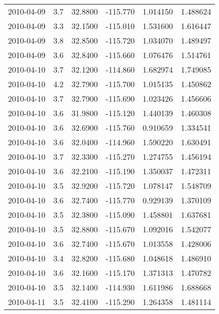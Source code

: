 \begin{tabular}{lrrrrr}
2010-04-09 &       3.7 &  32.8800 &  -115.770 &         1.014150 &         1.488624 \\
2010-04-09 &       3.3 &  32.1500 &  -115.010 &         1.531600 &         1.616447 \\
2010-04-09 &       3.8 &  32.8500 &  -115.720 &         1.034070 &         1.489497 \\
2010-04-09 &       3.6 &  32.8400 &  -115.660 &         1.076476 &         1.514761 \\
2010-04-10 &       3.7 &  32.1200 &  -114.860 &         1.682974 &         1.749085 \\
2010-04-10 &       4.2 &  32.7900 &  -115.700 &         1.015135 &         1.450862 \\
2010-04-10 &       3.7 &  32.7900 &  -115.690 &         1.023426 &         1.456606 \\
2010-04-10 &       3.6 &  31.9800 &  -115.120 &         1.440139 &         1.460308 \\
2010-04-10 &       3.6 &  32.6900 &  -115.760 &         0.910659 &         1.334541 \\
2010-04-10 &       3.6 &  32.0400 &  -114.960 &         1.590220 &         1.630491 \\
2010-04-10 &       3.7 &  32.3300 &  -115.270 &         1.274755 &         1.456194 \\
2010-04-10 &       3.6 &  32.2100 &  -115.190 &         1.350037 &         1.472311 \\
2010-04-10 &       3.5 &  32.9200 &  -115.720 &         1.078147 &         1.548709 \\
2010-04-10 &       3.6 &  32.7400 &  -115.770 &         0.929139 &         1.370109 \\
2010-04-10 &       3.5 &  32.3800 &  -115.090 &         1.458801 &         1.637681 \\
2010-04-10 &       3.5 &  32.8800 &  -115.670 &         1.092016 &         1.542077 \\
2010-04-10 &       3.6 &  32.7400 &  -115.670 &         1.013558 &         1.428006 \\
2010-04-10 &       3.4 &  32.8200 &  -115.680 &         1.048618 &         1.486910 \\
2010-04-10 &       3.6 &  32.1600 &  -115.170 &         1.371313 &         1.470782 \\
2010-04-10 &       3.5 &  32.1400 &  -114.930 &         1.611986 &         1.688668 \\
2010-04-11 &       3.5 &  32.4100 &  -115.290 &         1.264358 &         1.481114 \\

\end{tabular}
